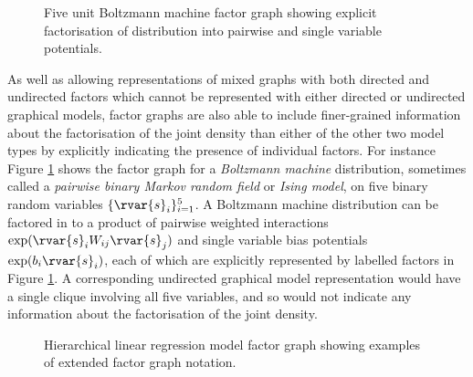 \begin{figure}[!t]
\vskip 0pt
\centering
{}
\caption[Boltzmann machine factor graph.]{Five unit Boltzmann machine factor graph showing explicit factorisation of distribution into pairwise and single variable potentials.}
\label{fig:boltzmann-machine-factor-graph}
\end{figure}

As well as allowing representations of mixed graphs with both directed and undirected factors which cannot be represented with either directed or undirected graphical models, factor graphs are also able to include finer-grained information about the factorisation of the joint density than either of the other two model types by explicitly indicating the presence of individual factors. For instance Figure \ref{fig:boltzmann-machine-factor-graph} shows the factor graph for a \emph{Boltzmann machine} distribution, sometimes called a \emph{pairwise binary Markov random field} or \emph{Ising model}, on five binary random variables $\lbrace \rvar{s}_i \rbrace_{i=1}^5$. A Boltzmann machine distribution can be factored in to a product of pairwise weighted interactions $\exp(\rvar{s}_i W_{ij} \rvar{s}_j)$ and single variable bias potentials $\exp(b_i \rvar{s}_i)$, each of which are explicitly represented by labelled factors in Figure \ref{fig:boltzmann-machine-factor-graph}. A corresponding undirected graphical model representation would have a single clique involving all five variables, and so would not indicate any information about the factorisation of the joint density.

\begin{figure}[!t]
\vskip 0pt
\centering
{}
\caption[Hierarchical linear regression model factor graph.]{Hierarchical linear regression model factor graph showing examples of extended factor graph notation.}%
\label{fig:hier-lin-regression-factor-graph}
\end{figure}

